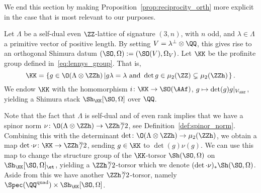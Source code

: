 We end this section by making Proposition~\ref{prop:reciprocity_orth} more explicit in the case that is most relevant to our purposes.

Let $\Lambda$ be a self-dual even $\ZZ$-lattice of signature $(3,n)$, with $n$ odd, and $\lambda \in \Lambda$ a primitive vector of positive length. By setting $V = \lambda^{\perp} \otimes \QQ$, this gives rise to an orthogonal Shimura datum $(\SO,\Omega):= (\SO(V),\Omega_V)$. Let $\KK$ be the profinite group defined in~\eqref{eq:lennys_group}. That is,
$$
{\KK} = \left\{g \in \O(\Lambda \otimes \ZZh) \left| g \lambda = \lambda \textnormal{ and } \det g \in \mu_2(\ZZ) \subsetneq \mu_2(\ZZh)\right.\right\}.
$$
We endow $\KK$ with the homomorphism $i\colon {\KK} \rightarrow \SO(\AAf)$, $g \mapsto \det(g) g|_{V_{\AAf}}$, yielding a Shimura stack $\Sh_{\KK}[\SO,\Omega]$ over $\QQ$.

Note that the fact that $\Lambda$ is self-dual and of even rank implies that we have a spinor norm $\nu\colon \O(\Lambda \otimes \ZZh) \rightarrow \ZZh^{\times}\hspace{-5pt}/2$, see Definition~\ref{def:spinor_norm}. Combining this with the determinant $\det\colon \O(\Lambda \otimes \ZZh) \rightarrow \mu_2(\ZZh)$, we obtain a map $\det \cdot \nu\colon {\KK} \rightarrow \ZZh^{\times}\hspace{-5pt}/2$, sending $g \in {\KK}$ to $\det(g)\nu(g)$. We can use this map to change the structure group of the ${\KK}$-torsor $\Sh(\SO,\Omega)$ on $\Sh_{\KK}[\SO,\Omega]_{\et}$, yielding a $\ZZh^{\times}\hspace{-5pt}/2$-torsor which we denote $(\det \cdot \nu)_* \Sh(\SO,\Omega)$. Aside from this we have another $\ZZh^{\times}\hspace{-5pt}/2$-torsor, namely $\Spec(\QQ^{\text{quad}}) \times \Sh_{{\KK}}[\SO,\Omega]$.

